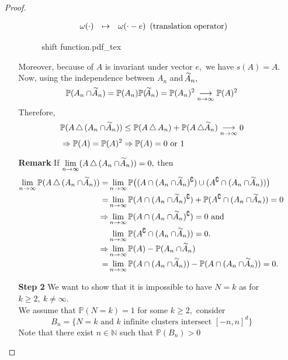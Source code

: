 \documentclass[12pt,a4paper]{article}
\newcommand{\oversim}[1]{\parbox[t][-18pt][c]{10pt}{\scriptsize$\sim$}\hspace*{-12pt}{#1}}
\newcommand{\incfig}[1]{%
{#1.pdf_tex}
}
\begin{document}
\begin{enumerate}
\begin{proof}
\begin{enumerate}
\[\begin{array}[c]{rcl}
		\omega(\cdot) & \mapsto & \omega(\cdot-e)
		\end{array}(\mbox{translation operator})
		\]
		\begin{figure}[htp]
		\centering
		\def\svgwidth{10cm}
		\incfig{shift function}
		\end{figure}
		Moreover, because of $A$ is invariant under vector $e,$ we have $s(A)=A.$ Now, using the independence between $A_n$ and $\oversim{A}_n,$
		\[
		\mathbb{P}(A_n\cap\oversim{A}_n)=\mathbb{P}(A_n)\mathbb{P}(\oversim{A}_n)=\mathbb{P}(A_n)^2\underset{n\to\infty}{\longrightarrow}\mathbb{P}(A)^2
		\]
		Therefore,
		\begin{align*}
		&\mathbb{P}(A\,\triangle\, (A_n\cap \oversim{A}_n))\leq \mathbb{P}(A\,\triangle\, A_n)+\mathbb{P}(A\,\triangle\, \oversim{A}_n)\underset{n\to\infty}{\longrightarrow}0\\
		&\Rightarrow \mathbb{P}(A)=\mathbb{P}(A)^2\Rightarrow \mathbb{P}(A)=0\mbox{ or }1
		\end{align*}
		\item[\textbf{Remark}] If $\lim\limits_{n\to\infty}(A\,\triangle\,(A_n\cap\oversim{A}_n))=0,$ then
		\begin{align*}
		\lim_{n\to\infty}\mathbb{P}(A\, \triangle \, (A_n\cap\oversim{A}_n))=&\lim_{n\to\infty}\mathbb{P}\big((A\cap(A_n\cap\oversim{A}_n)^\complement)\cup (A^\complement\cap(A_n\cap\oversim{A}_n))\big)\\
		=&\lim_{n\to\infty}\mathbb{P}(A\cap(A_n\cap\oversim{A}_n)^\complement)+\mathbb{P} (A^\complement\cap(A_n\cap\oversim{A}_n))=0\\
		\Rightarrow & \lim_{n\to\infty}\mathbb{P}(A\cap(A_n\cap\oversim{A}_n)^\complement)=0 \mbox{ and }\\
		 &\lim_{n\to\infty}\mathbb{P} (A^\complement\cap(A_n\cap\oversim{A}_n))=0.\\
		\Rightarrow & \lim_{n\to\infty}\mathbb{P}(A)-\mathbb{P}(A_n\cap\oversim{A}_n)\\
		= & \lim_{n\to\infty}\mathbb{P}(A\cap(A_n\cap\oversim{A}_n))-\mathbb{P}(A\cap (A_n\cap\oversim{A}_n))=0.
		\end{align*}
		\item[\textbf{Step 2}] We want to show that it is impossible to have $N=k$ as for $k\geq 2,\ k\neq \infty.$ \\
	We assume that $\mathbb{P}(N=k)=1$ for some $k\geq 2,$ consider 
	\[
	B_n=\{N=k \mbox{ and } k \mbox{ infinite clusters intersect } [-n,n]^d\}
	\]
	Note that there exist $n\in \mathbb{N}$ such that $\mathbb{P}(B_n)>0$
	\end{enumerate}
	\end{proof}
\end{enumerate}
\end{document}
